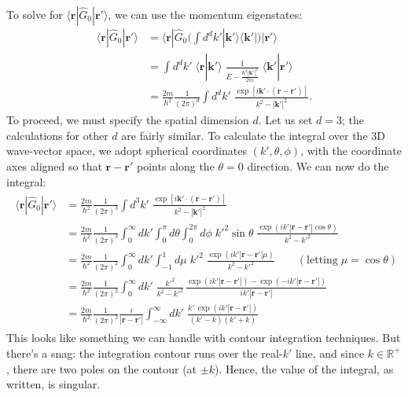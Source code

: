 \documentclass[pra,12pt]{revtex4}
\begin{document}
To solve for $\langle\mathbf{r}|\hat{G}_0|\mathbf{r}'\rangle$, we can
use the momentum eigenstates:
\begin{align}
  \langle\mathbf{r}|\hat{G}_0|\mathbf{r}'\rangle
  &= \langle\mathbf{r}|\hat{G}_0 \Big(\int d^dk' |\mathbf{k}'\rangle\langle\mathbf{k}'| \Big) |\mathbf{r}'\rangle \nonumber \\
  &= \int d^dk' \; \langle\mathbf{r}|\mathbf{k}'\rangle \;
  \frac{1}{E-\frac{\hbar^2|\mathbf{k}'|^2}{2m}} \;
  \langle\mathbf{k}'|\mathbf{r}'\rangle \nonumber \\
  &= \frac{2m}{\hbar^2} \frac{1}{(2\pi)^d} \int d^dk' \;
  \frac{\exp\left[i\mathbf{k}' \cdot
      (\mathbf{r}-\mathbf{r}')\right]}{k^2-|\mathbf{k}'|^2}.
  \label{rGr}
\end{align}
To proceed, we must specify the spatial dimension $d$.  Let us set $d
= 3$; the calculations for other $d$ are fairly similar.  To calculate
the integral over the 3D wave-vector space, we adopt spherical
coordinates $(k',\theta,\phi)$, with the coordinate axes aligned so
that $\mathbf{r}-\mathbf{r}'$ points along the $\theta=0$ direction.
We can now do the integral:
\begin{align*}
  \begin{aligned}\langle\mathbf{r}|\hat{G}_0|\mathbf{r}'\rangle &= \frac{2m}{\hbar^2} \frac{1}{(2\pi)^3} \int d^3k' \; \frac{\exp\left[i\mathbf{k}'\cdot (\mathbf{r}-\mathbf{r}')\right]}{k^2-|\mathbf{k}'|^2} \\ &= \frac{2m}{\hbar^2} \frac{1}{(2\pi)^3} \int_0^\infty dk' \int_0^\pi d\theta \int_{0}^{2\pi} d\phi \;{k'}^{2}\sin\theta\; \frac{\displaystyle \exp\left(ik'|\mathbf{r}-\mathbf{r}'|\cos\theta\right)}{k^2-{k'}^2} \\ &= \frac{2m}{\hbar^2} \frac{1}{(2\pi)^2} \int_0^\infty dk' \int_{-1}^1 d\mu \;{k'}^2\; \frac{\displaystyle \exp\left(ik'|\mathbf{r}-\mathbf{r}'|\mu\right)}{k^2-{k'}^2} \qquad(\text{letting}\;\mu = \cos\theta) \\ &= \frac{2m}{\hbar^2} \frac{1}{(2\pi)^2} \int_0^\infty dk' \; \frac{ {k'}^2}{k^2-{k'}^2}\, \frac{\displaystyle \exp\left(ik'|\mathbf{r}-\mathbf{r}'|\right) - \exp\left(-ik'|\mathbf{r}-\mathbf{r}'|\right)}{ik'|\mathbf{r}-\mathbf{r}'|} \\ &= \frac{2m}{\hbar^2} \frac{1}{(2\pi)^2} \frac{i}{|\mathbf{r}-\mathbf{r}'|} \int_{-\infty}^\infty dk' \; \frac{\displaystyle k'\, \exp\left(ik'|\mathbf{r}-\mathbf{r}'|\right)}{(k' - k)(k'+k)}\end{aligned}
\end{align*}
This looks like something we can handle with contour integration
techniques.  But there's a snag: the integration contour runs over the
real-$k'$ line, and since $k \in \mathbb{R}^+$, there are two poles
on the contour (at $\pm k$).  Hence, the value of the integral, as
written, is singular.
\end{document}
